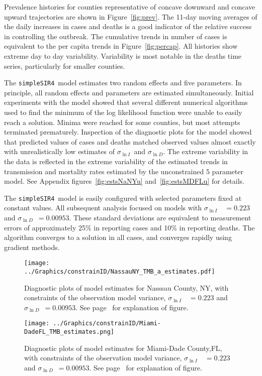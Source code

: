 \documentclass[12pt,letterpaper]{article}
\newcommand\SSm{{\tt simpleSIR4}}
\newcommand\slI{$\sigma_{\ln I}$\ }
\newcommand\slD{$\sigma_{\ln D}$}
\begin{document}
Prevalence histories for counties representative of concave
downward and concave upward trajectories are shown in
Figure~\ref{fig:prev}. The 11-day moving averages of the daily
increases in cases and deaths is a good indicator of the
relative success in controlling the outbreak.
The cumulative trends in number of cases is equivalent to 
the per capita trends in Figure~\ref{fig:percap}.
All histories show extreme day to day variability.
Variability is most notable in the deaths
time series, particularly for smaller counties.

The \SSm\  model estimates two random effects and five parameters.
In principle, all random effects and parameters are estimated
simultaneously.
Initial experiments with the model showed that several different
numerical algorithms used to find the minimum of the log likelihood
function were unable to easily reach a solution. Minima were reached
for some counties, but most attempts terminated prematurely. 
Inspection of the diagnostic plots for the model showed that predicted
values of cases and deaths matched observed values almost exactly
with unrealistically low estimates of \slI and \slD.
The extreme variability in the data is reflected in the extreme
variability of the estimated trends in transmission and mortality
rates estimated by the unconstrained 5 parameter model.
See Appendix figures~\ref{fig:estsNaNYu} and~\ref{fig:estsMDFLu}
for details.

The \SSm\ model is easily configured with selected parameters fixed at
constant values. 
All subsequent analysis focused on models with 
\slI~$ = 0.223$ and \slD~$= 0.00953$. 
These standard deviations are equivalent to measurement errors of
approximately 25\% in reporting cases and 10\% in reporting deaths.
The algorithm converges to a solution in all cases, and converges
rapidly using gradient methods.

\begin{figure}
\begin{center}
\texttt{[image: ../Graphics/constrainID/NassauNY\_TMB\_a\_estimates.pdf]}
\end{center}
\caption{\label{fig:estsNaNYc}
Diagnostic plots of model estimates for Nasssau County, NY, 
with constraints of the observation model variance, 
\slI~$ = 0.223$ and \slD~$= 0.00953$. 
See page~\pageref{pp:diagexpl} for explanation of figure.
}
\end{figure}

\begin{figure}
\begin{center}
\texttt{[image: ../Graphics/constrainID/Miami-DadeFL\_TMB\_estimates.png]}
\end{center}
\caption{\label{fig:estsMDFLc}
Diagnostic plots of model estimates for Miami-Dade County,FL,
with constraints of the observation model variance, 
\slI~$ = 0.223$ and \slD~$= 0.00953$. 
See page~\pageref{pp:diagexpl} for explanation of figure.
}
\end{figure}
\end{document}
